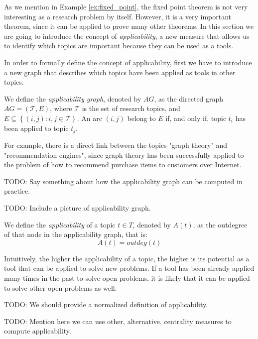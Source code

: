As we mention in Example \ref{ex:fixed_point}, the fixed point theorem is not very interesting as a research problem by itself. However, it is a very important theorem, since it can be applied to prove many other theorems. In this section we are going to introduce the concept of \emph{applicability}, a new measure that allows us to identify which topics are important because they can be used as a tools.

In order to formally define the concept of applicability, first we have to introduce a new graph that describes which topics have been applied as tools in other topics.

\begin{definition}
\label{def:applicability-graph}
We define the \emph{applicability graph}, denoted by $AG$, as the directed graph $AG = (\mathcal{T}, E)$, where $\mathcal{T}$ is the set of research topics, and $E\subseteq\left\{ (i,j):i,j\in \mathcal{T} \right\} $. An arc $(i, j)$ belong to $E$ if, and only if, topic $t_i$ has been applied to topic $t_j$.
\end{definition}

For example, there is a direct link between the topics "graph theory" and "recommendation engines", since graph theory has been successfully applied to the problem of how to recommend purchase items to customers over Internet.

{\color{red} TODO: Say something about how the applicability graph can be computed in practice.}

{\color{red} TODO: Include a picture of applicability graph.}

\begin{definition}
\label{def:applicability}
We define the \emph{applicability} of a topic $t\in T$, denoted by $A(t)$, as the outdegree of that node in the applicability graph, that is:
\[
A(t) = outdeg(t)
\]
\end{definition}

Intuitively, the higher the applicability of a topic, the higher is its potential as a tool that can be applied to solve new problems. If a tool has been already applied many times in the past to solve open problems, it is likely that it can be applied to solve other open problems as well.

{\color{red} TODO: We should provide a normalized definition of applicability.}

{\color{red} TODO: Mention here we can use other, alternative, centrality measures to compute applicability.}

